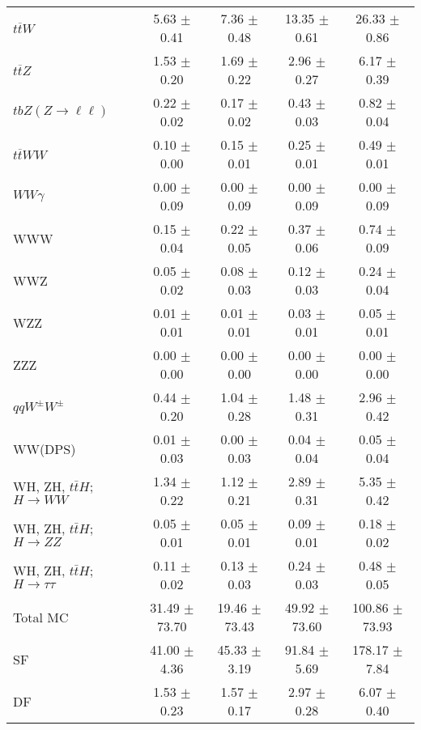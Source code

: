 \begin{tabular}{l|cccc}
                   $t\overline{t}W$ &  5.63 $\pm$  0.41 &  7.36 $\pm$  0.48 & 13.35 $\pm$  0.61 & 26.33 $\pm$  0.86 \\
                   $t\overline{t}Z$ &  1.53 $\pm$  0.20 &  1.69 $\pm$  0.22 &  2.96 $\pm$  0.27 &  6.17 $\pm$  0.39 \\
    $tbZ (Z \rightarrow \ell \ell)$ &  0.22 $\pm$  0.02 &  0.17 $\pm$  0.02 &  0.43 $\pm$  0.03 &  0.82 $\pm$  0.04 \\
                  $t\overline{t}WW$ &  0.10 $\pm$  0.00 &  0.15 $\pm$  0.01 &  0.25 $\pm$  0.01 &  0.49 $\pm$  0.01 \\
                         $WW\gamma$ &  0.00 $\pm$  0.09 &  0.00 $\pm$  0.09 &  0.00 $\pm$  0.09 &  0.00 $\pm$  0.09 \\
                                WWW &  0.15 $\pm$  0.04 &  0.22 $\pm$  0.05 &  0.37 $\pm$  0.06 &  0.74 $\pm$  0.09 \\
                                WWZ &  0.05 $\pm$  0.02 &  0.08 $\pm$  0.03 &  0.12 $\pm$  0.03 &  0.24 $\pm$  0.04 \\
                                WZZ &  0.01 $\pm$  0.01 &  0.01 $\pm$  0.01 &  0.03 $\pm$  0.01 &  0.05 $\pm$  0.01 \\
                                ZZZ &  0.00 $\pm$  0.00 &  0.00 $\pm$  0.00 &  0.00 $\pm$  0.00 &  0.00 $\pm$  0.00 \\
                 $qqW^{\pm}W^{\pm}$ &  0.44 $\pm$  0.20 &  1.04 $\pm$  0.28 &  1.48 $\pm$  0.31 &  2.96 $\pm$  0.42 \\
                            WW(DPS) &  0.01 $\pm$  0.03 &  0.00 $\pm$  0.03 &  0.04 $\pm$  0.04 &  0.05 $\pm$  0.04 \\
WH, ZH, $t\bar{t}H$; $H \rightarrow WW$ &  1.34 $\pm$  0.22 &  1.12 $\pm$  0.21 &  2.89 $\pm$  0.31 &  5.35 $\pm$  0.42 \\
WH, ZH, $t\bar{t}H$; $H \rightarrow ZZ$ &  0.05 $\pm$  0.01 &  0.05 $\pm$  0.01 &  0.09 $\pm$  0.01 &  0.18 $\pm$  0.02 \\
WH, ZH, $t\bar{t}H$; $H \rightarrow \tau\tau$ &  0.11 $\pm$  0.02 &  0.13 $\pm$  0.03 &  0.24 $\pm$  0.03 &  0.48 $\pm$  0.05 \\
\hline\hline
                           Total MC & 31.49 $\pm$ 73.70 & 19.46 $\pm$ 73.43 & 49.92 $\pm$ 73.60 & 100.86 $\pm$ 73.93 \\
\hline
                                 SF & 41.00 $\pm$  4.36 & 45.33 $\pm$  3.19 & 91.84 $\pm$  5.69 & 178.17 $\pm$  7.84 \\
                                 DF &  1.53 $\pm$  0.23 &  1.57 $\pm$  0.17 &  2.97 $\pm$  0.28 &  6.07 $\pm$  0.40 \\

\end{tabular}
